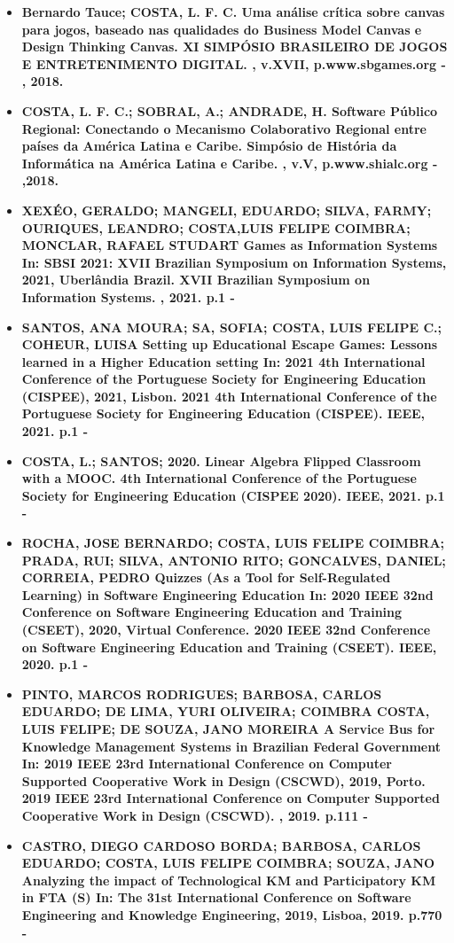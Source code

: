\begin {itemize}
    \item\textbf {Bernardo Tauce; COSTA, L. F. C.
Uma análise crítica sobre canvas para jogos, baseado nas qualidades do Business Model Canvas e
Design Thinking Canvas. XI SIMPÓSIO BRASILEIRO DE JOGOS E ENTRETENIMENTO DIGITAL. , v.XVII, p.www.sbgames.org - , 2018.}
     \item\textbf {COSTA, L. F. C.; SOBRAL, A.; ANDRADE, H.
Software Público Regional: Conectando o Mecanismo Colaborativo Regional entre países da América
Latina e Caribe. Simpósio de História da Informática na América Latina e Caribe. , v.V, p.www.shialc.org - ,2018.}
     \item\textbf {XEXÉO, GERALDO; MANGELI, EDUARDO; SILVA, FARMY; OURIQUES, LEANDRO; COSTA,LUIS FELIPE COIMBRA; MONCLAR, RAFAEL STUDART
Games as Information Systems In: SBSI 2021: XVII Brazilian Symposium on Information Systems, 2021,
Uberlândia Brazil. XVII Brazilian Symposium on Information Systems. , 2021. p.1 -}
     \item\textbf {SANTOS, ANA MOURA; SA, SOFIA; COSTA, LUIS FELIPE C.; COHEUR, LUISA
Setting up Educational Escape Games: Lessons learned in a Higher Education setting In: 2021 4th
International Conference of the Portuguese Society for Engineering Education (CISPEE), 2021, Lisbon.
2021 4th International Conference of the Portuguese Society for Engineering Education (CISPEE).
IEEE, 2021. p.1 -}
     \item\textbf {COSTA, L.; SANTOS; 2020. Linear Algebra Flipped Classroom with a MOOC. 4th
International Conference of the Portuguese Society for Engineering Education (CISPEE 2020).
IEEE, 2021. p.1 -}
    \item\textbf {ROCHA, JOSE BERNARDO; COSTA, LUIS FELIPE COIMBRA; PRADA, RUI; SILVA, ANTONIO
RITO; GONCALVES, DANIEL; CORREIA, PEDRO
Quizzes (As a Tool for Self-Regulated Learning) in Software Engineering Education In: 2020 IEEE 32nd
Conference on Software Engineering Education and Training (CSEET), 2020, Virtual Conference.
2020 IEEE 32nd Conference on Software Engineering Education and Training (CSEET). IEEE,
2020. p.1 -}
    \item\textbf {PINTO, MARCOS RODRIGUES; BARBOSA, CARLOS EDUARDO; DE LIMA, YURI OLIVEIRA;
COIMBRA COSTA, LUIS FELIPE; DE SOUZA, JANO MOREIRA
A Service Bus for Knowledge Management Systems in Brazilian Federal Government In: 2019 IEEE 23rd
International Conference on Computer Supported Cooperative Work in Design (CSCWD), 2019, Porto.
2019 IEEE 23rd International Conference on Computer Supported Cooperative Work in Design
(CSCWD). , 2019. p.111 -}
    \item\textbf {CASTRO, DIEGO CARDOSO BORDA; BARBOSA, CARLOS EDUARDO; COSTA, LUIS FELIPE
COIMBRA; SOUZA, JANO
Analyzing the impact of Technological KM and Participatory KM in FTA (S) In: The 31st International Conference on Software Engineering and Knowledge Engineering, 2019, Lisboa, 2019. p.770 -}
\end {itemize}


